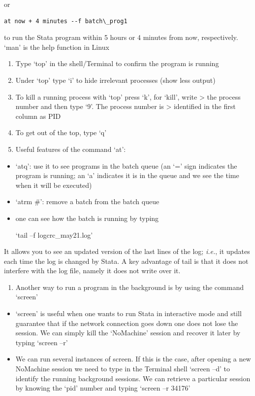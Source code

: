 \documentclass[]{book}
\providecommand{\tightlist}{%
  \setlength{\itemsep}{0pt}\setlength{\parskip}{0pt}}
\begin{document}
or

\begin{verbatim}
at now + 4 minutes --f batch\_prog1
\end{verbatim}

to run the Stata program within 5 hours or 4 minutes from now,
respectively. `man' is the help function in Linux

\begin{enumerate}
\def\labelenumi{\arabic{enumi}.}
\setcounter{enumi}{9}
\item
  Type `top' in the shell/Terminal to confirm the program is running
\item
  Under `top' type `i' to hide irrelevant processes (show less output)
\item
  To kill a running process with `top' press `k', for `kill', write
  \textgreater{} the process number and then type `9'. The process number is
  \textgreater{} identified in the first column as PID
\item
  To get out of the top, type `q'
\item
  Useful features of the command `at':
\end{enumerate}

\begin{itemize}
\item
  `atq': use it to see programs in the batch queue (an `=' sign
  indicates the program is running; an `a' indicates it is in
  the queue and we see the time when it will be executed)
\item
  `atrm \#': remove a batch from the batch queue
\item
  one can see how the batch is running by typing

  `tail --f logcrc\_may21.log'
\end{itemize}

It allows you to see an updated version of the last lines of the log;
\emph{i.e.}, it updates each time the log is changed by Stata. A key
advantage of tail is that it does not interfere with the log file,
namely it does not write over it.

\begin{enumerate}
\def\labelenumi{\arabic{enumi}.}
\setcounter{enumi}{14}
\tightlist
\item
  Another way to run a program in the background is by using the
  command `screen'
\end{enumerate}

\begin{itemize}
\item
  `screen' is useful when one wants to run Stata in interactive
  mode and still guarantee that if the network connection goes
  down one does not lose the session. We can simply kill the
  `NoMachine' session and recover it later by typing `screen
  --r'
\item
  We can run several instances of screen. If this is the case,
  after opening a new NoMachine session we need to type in the
  Terminal shell `screen --d' to identify the running background
  sessions. We can retrieve a particular session by knowing the
  `pid' number and typing `screen --r 34176'
\end{itemize}
\end{document}
